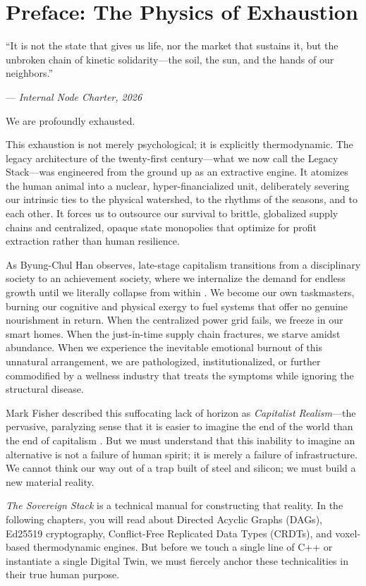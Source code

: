 \chapter{Preface: The Physics of Exhaustion}

\epigraph{``It is not the state that gives us life, nor the market that sustains it, but the unbroken chain of kinetic solidarity---the soil, the sun, and the hands of our neighbors.''}{--- \textit{Internal Node Charter, 2026}}

We are profoundly exhausted. 

This exhaustion is not merely psychological; it is explicitly thermodynamic. The legacy architecture of the twenty-first century---what we now call the Legacy Stack---was engineered from the ground up as an extractive engine. It atomizes the human animal into a nuclear, hyper-financialized unit, deliberately severing our intrinsic ties to the physical watershed, to the rhythms of the seasons, and to each other. It forces us to outsource our survival to brittle, globalized supply chains and centralized, opaque state monopolies that optimize for profit extraction rather than human resilience. 

As Byung-Chul Han observes, late-stage capitalism transitions from a disciplinary society to an achievement society, where we internalize the demand for endless growth until we literally collapse from within \parencite{han2015}. We become our own taskmasters, burning our cognitive and physical exergy to fuel systems that offer no genuine nourishment in return. When the centralized power grid fails, we freeze in our smart homes. When the just-in-time supply chain fractures, we starve amidst abundance. When we experience the inevitable emotional burnout of this unnatural arrangement, we are pathologized, institutionalized, or further commodified by a wellness industry that treats the symptoms while ignoring the structural disease. 

Mark Fisher described this suffocating lack of horizon as \textit{Capitalist Realism}---the pervasive, paralyzing sense that it is easier to imagine the end of the world than the end of capitalism \parencite{fisher2009}. But we must understand that this inability to imagine an alternative is not a failure of human spirit; it is merely a failure of infrastructure. We cannot think our way out of a trap built of steel and silicon; we must build a new material reality.

\textit{The Sovereign Stack} is a technical manual for constructing that reality. In the following chapters, you will read about Directed Acyclic Graphs (DAGs), Ed25519 cryptography, Conflict-Free Replicated Data Types (CRDTs), and voxel-based thermodynamic engines. But before we touch a single line of C++ or instantiate a single Digital Twin, we must fiercely anchor these technicalities in their true human purpose. 

